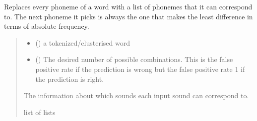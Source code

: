 \documentclass[letterpaper,10pt,english]{sphinxmanual}
\begin{document}
\begin{fulllineitems}
\begin{fulllineitems}
\end{fulllineitems}


\begin{fulllineitems}
\label{\detokenize{documentation:loanpy.scapplier.Adrc.read_sc}}
\pysigstartsignatures
{}
\pysigstopsignatures
\sphinxAtStartPar
Replaces every phoneme of a word with a list of phonemes
that it can correspond to. The next phoneme it picks is
always the one that makes the least difference in terms
of absolute frequency.
\begin{quote}\begin{description}
\begin{itemize}
\item {} 
\sphinxAtStartPar
{} () \textendash{} a tokenized/clusterised word

\item {} 
\sphinxAtStartPar
{} (\sphinxstyleliteralemphasis{\sphinxupquote{, }}) \textendash{} The desired number of possible combinations.
This is the false positive rate if the prediction
is wrong but the false positive rate \sphinxhyphen{}1 if the
prediction is right.

\end{itemize}

\sphinxAtStartPar
The information about which sounds each input sound can
correspond to.

\sphinxAtStartPar
list of lists

\end{description}\end{quote}

\sphinxAtStartPar
{}


\end{fulllineitems}
\end{fulllineitems}
\end{document}
